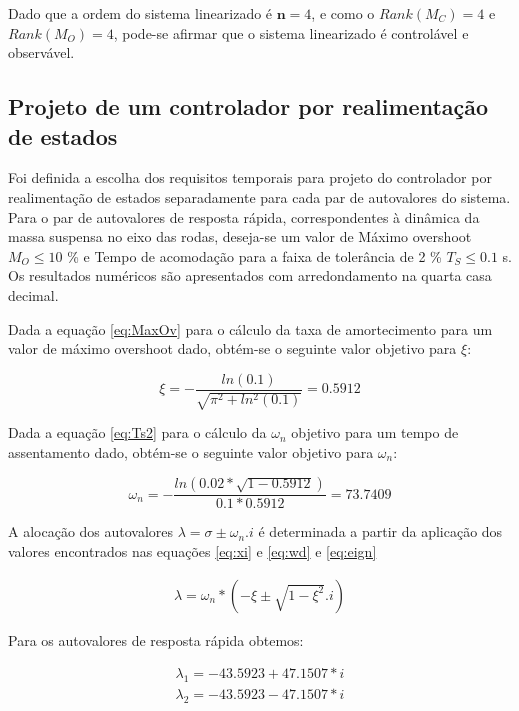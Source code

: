 \documentclass[a4paper]{ifacconf}
\begin{document}
Dado que a ordem do sistema linearizado é $\mathbf{n}=4$, e como o $Rank(M_C)=4$ e $Rank(M_O)=4$, pode-se afirmar que o sistema linearizado é controlável e observável.

    
        \subsection{Projeto de um controlador por realimentação de estados} \label{sc:projeto_controlador_full}

Foi definida a escolha dos requisitos temporais para projeto do controlador por realimentação de estados separadamente para cada par de autovalores do sistema. Para o par de autovalores de resposta rápida, correspondentes à dinâmica da massa suspensa no eixo das rodas, deseja-se um valor de Máximo overshoot $M_O \leq 10$ \% e Tempo de acomodação para a faixa de tolerância de 2 \% $T_S \leq 0.1$ s. Os resultados numéricos são apresentados com arredondamento na quarta casa decimal.

Dada a equação \ref{eq:MaxOv} para o cálculo da taxa de amortecimento para um valor de máximo overshoot dado, obtém-se o seguinte valor objetivo para $\xi$:

\begin{equation*}
    \xi=-\frac{ln\left(0.1\right)}{\sqrt{\pi^2+ln^2(0.1)}}=0.5912
\end{equation*}

Dada a equação \ref{eq:Ts2} para o cálculo da $\omega_n$ objetivo para um tempo de assentamento dado, obtém-se o seguinte valor objetivo para $\omega_n$:

\begin{equation*}
    \omega_n=-\frac{ln\left( 0.02*\sqrt{1-0.5912} \right)}{0.1*0.5912}=73.7409
\end{equation*}

A alocação dos autovalores $\lambda = \sigma \pm \omega_n.i$ é determinada a partir da aplicação dos valores encontrados nas equações \ref{eq:xi} e \ref{eq:wd} e \ref{eq:eign}

\begin{align} \label{eq:autovalores_de_xi}
     \lambda = \omega_n * (-\xi \pm \sqrt{1-\xi^2}.i)
\end{align}

Para os autovalores de resposta rápida obtemos:

\begin{align*} \label{eq:autovalores_nao_dominantes}
     \lambda_1 = -43.5923 + 47.1507*i\\
     \lambda_2 = -43.5923 - 47.1507*i\\
\end{align*}
\end{document}
